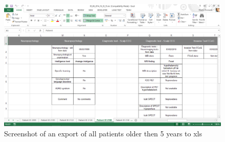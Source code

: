 \documentclass[thesis=B,english]{FITthesis}[2012/10/20]
\begin{document}
\begin{figure}
	\centering
 	\includegraphics[width=1\textwidth]{images/xlsExport_2.png}
 	\caption{Screenshot of an export of all patients older then 5 years to xls}
 	\label{fig:xlsExport_2}
\end{figure}
\end{document}
